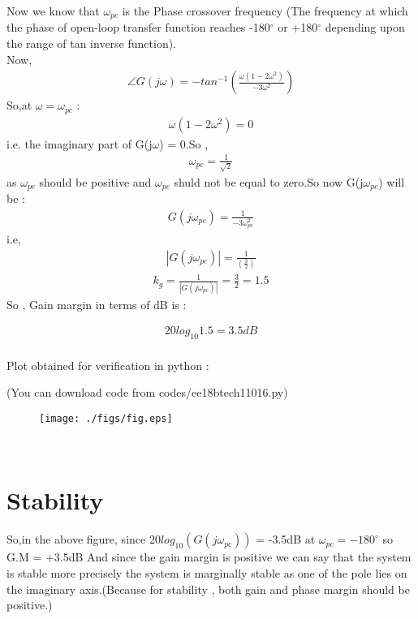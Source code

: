 \begin{enumerate}[label=\thesection.\arabic*.,ref=\thesection.\theenumi]
Now we know that $\omega_{pc}$ is the Phase crossover frequency (The frequency at which the phase of open-loop transfer function reaches -180$^{\circ}$ or +180$^{\circ}$ depending upon the range of tan inverse function).\\
Now,
\begin{align}
\angle G(j\omega)=- tan^{-1}(\frac{\omega(1-2\omega^2)}{-3\omega^2})
\end{align}
So,at $\omega=\omega_{pc}$ :
\begin{align}
\omega(1-2\omega^2) = 0 
\end{align}
i.e. the imaginary part of G(j$\omega$) = 0.So ,
\begin{align}
\omega_{pc} = \frac{1}{\sqrt{2}} 
\end{align}
as $\omega_{pc}$ should be positive and $\omega_{pc}$ shuld not be equal to zero.So now G(j$\omega_{pc}$) will be :
\begin{align}
G(j\omega_{pc}) = \frac{1}{-3\omega_{pc}^2}
\end{align}
i.e,
\begin{align}
|G(j\omega_{pc})| = \frac{1}{(\frac{3}{2})}
\end{align}
\begin{align}
k_{g}=\frac{1}{|G(j\omega_{pc})|} = \frac{3}{2}=1.5
\end{align}
So , Gain margin in terms of dB is :

\begin{align}
20log_{10}1.5 = 3.5dB
\end{align}
\\

Plot obtained for verification in python :

(You can download code from codes/ee18btech11016.py)
\begin{figure}[htp]
	\centering
	\texttt{[image: ./figs/fig.eps]}
	\caption{}
	\label{fig:Phase}
\end{figure}
\\

\section{Stability}

So,in the above figure, since $20log_{10}(G(j\omega_{pc}))$ = -3.5dB at $\omega_{pc} = -180^{\circ}$ so G.M = +3.5dB And since the gain margin is positive we can say that the system is stable more precisely the system is marginally stable as one of the pole lies on the imaginary axis.(Because for stability , both gain and phase margin should be positive.)
\\



\end{enumerate}
